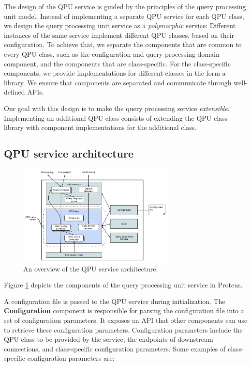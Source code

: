 \medskip
\noindent
The design of the QPU service is guided by the principles of the query processing unit model.
Instead of implementing a separate QPU service for each QPU class,
we design the query processing unit service as a \textit{polymorphic} service:
Different instances of the same service implement different QPU classes, based on their configuration.
To achieve that, we separate the components that are common to every QPU class,
such as the configuration and query processing domain component,
and the components that are class-specific.
For the class-specific components, we provide implementations for different classes in the form a library.
We ensure that components are separated and communicate through well-defined APIs.

Our goal with this design is to make the query processing service \textit{extensible}.
Implementing an additional QPU class consists of extending the QPU class library with component implementations
for the additional class.

\subsection{QPU service architecture}

\begin{figure}
  \centering
    \includegraphics[width=0.7\textwidth]{./figures/proteus/QPU_architecture.pdf}
  \caption{An overview of the QPU service architecture.}
  \label{fig:qpu_arch}
\end{figure}

\medskip
\noindent
Figure \ref{fig:qpu_arch} depicts the components of the query processing unit service in Proteus.

\medskip
\noindent
A configuration file is passed to the QPU service during initialization.
The \textbf{Configuration} component is responsible for parsing the configuration file into a set of configuration parameters.
It exposes an API that other components can use to retrieve these configuration parameters.
Configuration parameters include the QPU class to be provided by the service,
the endpoints of downstream connections, and class-specific configuration parameters.
Some examples of class-specific configuration parameters are:

